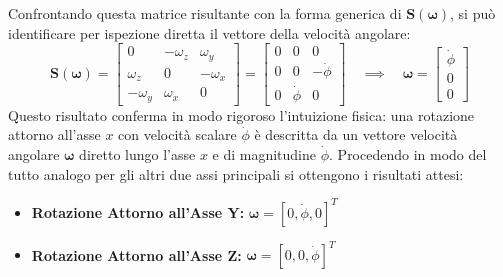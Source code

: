 \documentclass[11pt, a4paper]{report}
\begin{document}
Confrontando questa matrice risultante con la forma generica di \(\bm{S}(\bm{\omega})\), si può identificare per ispezione diretta il vettore della velocità angolare:
\[
    \bm{S}(\bm{\omega}) = \begin{bmatrix}
        0 & -\omega_z & \omega_y \\
        \omega_z & 0 & -\omega_x \\
        -\omega_y & \omega_x & 0
    \end{bmatrix}
    =
    \begin{bmatrix}
        0 & 0 & 0 \\
        0 & 0 & -\dot{\phi} \\
        0 & \dot{\phi} & 0
    \end{bmatrix}
    \quad \implies \quad
    \bm{\omega} = \begin{bmatrix} \dot{\phi} \\ 0 \\ 0 \end{bmatrix}
\]
Questo risultato conferma in modo rigoroso l'intuizione fisica: una rotazione attorno all'asse \(x\) con velocità scalare \(\dot{\phi}\) è descritta da un vettore velocità angolare \(\bm{\omega}\) diretto lungo l'asse \(x\) e di magnitudine \(\dot{\phi}\). Procedendo in modo del tutto analogo per gli altri due assi principali si ottengono i risultati attesi:
\begin{itemize}
    \item \textbf{Rotazione Attorno all'Asse Y:} \quad \(\bm{\omega} = [0, \dot{\phi}, 0]^T\)
    \item \textbf{Rotazione Attorno all'Asse Z:} \quad \(\bm{\omega} = [0, 0, \dot{\phi}]^T\)
\end{itemize}

\newpage
\end{document}
